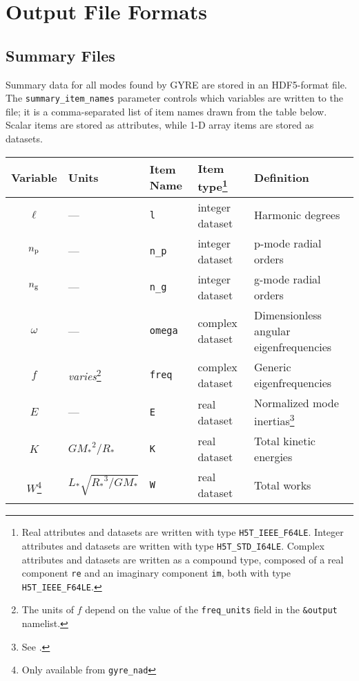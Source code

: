 \documentclass{article}
\newcommand{\Rstar}{\ensuremath{R_{\ast}}}
\newcommand{\Mstar}{\ensuremath{M_{\ast}}}
\newcommand{\Lstar}{\ensuremath{L_{\ast}}}
\begin{document}
\section*{Output File Formats}

\subsection*{Summary Files}

Summary data for all modes found by GYRE are stored in an HDF5-format
file. The \texttt{summary\_item\_names} parameter controls which variables
are written to the file; it is a comma-separated list of item names
drawn from the table below. Scalar items are stored as attributes,
while 1-D array items are stored as datasets.

\begin{center}
\begin{longtable}{cllll} \hline
Variable & Units & Item Name & Item type\footnote{%
\label{foot:data-type}
Real attributes and datasets are written with type \texttt{H5T\_IEEE\_F64LE}. 
Integer attributes and datasets are written with type \texttt{H5T\_STD\_I64LE}. 
Complex attributes and datasets are written as a compound type, composed of a real component \texttt{re} and an imaginary component \texttt{im}, both with type \texttt{H5T\_IEEE\_F64LE}.} & 
Definition \\ \hline
$\ell$ & --- & \texttt{l} & integer dataset & Harmonic degrees \\
$n_{\rm p}$ & --- & \texttt{n\_p} & integer dataset & p-mode radial orders \\
$n_{\rm g}$ & --- & \texttt{n\_g} & integer dataset & g-mode radial orders \\
$\omega$ & ---   & \texttt{omega} & complex dataset & Dimensionless angular eigenfrequencies \\
$f$      & \emph{varies}\footnote{%
\label{foot:freq-units}
The units of $f$ depend on the value of the
\texttt{freq\_units} field in the \texttt{\&output} namelist.} & 
\texttt{freq} & complex dataset & Generic eigenfrequencies \\
$E$ & --- & \texttt{E} & real dataset & Normalized mode inertias\footnote{\label{foot:inertia}See \citet[][his eqn.~13]{ChrDal2012}.} \\
$K$ & $G\Mstar^{2}/\Rstar$ & \texttt{K} & real dataset & Total kinetic energies \\
$W$\footnote{%
\label{foot:coeffs-nad}
Only available from \texttt{gyre\_nad}} & $\Lstar \sqrt{\Rstar^{3}/G\Mstar}$ & \texttt{W} & real dataset & Total works \\

\end{longtable}
\end{center}
\end{document}
